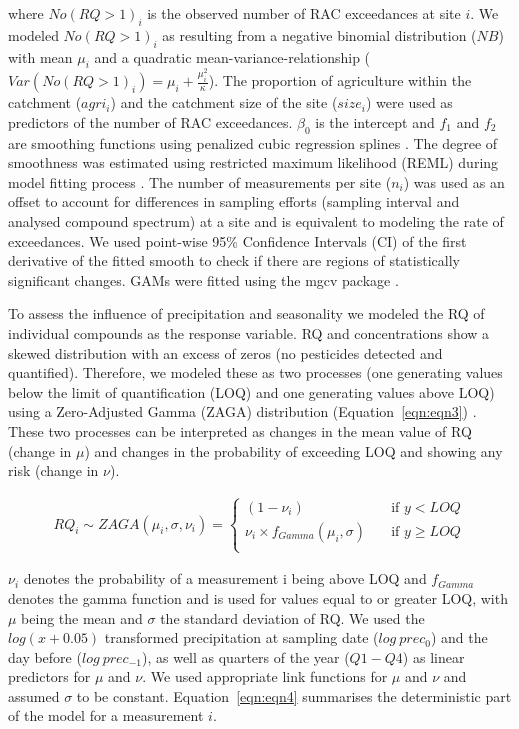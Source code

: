 \documentclass[journal=esthag,manuscript=article]{achemso}
\begin{document}
where $No(RQ > 1)_i$ is the observed number of RAC exceedances at site $i$. 
We modeled $No(RQ > 1)_i$ as resulting from a negative binomial distribution ($NB$) with mean $\mu_i$ and a quadratic mean-variance-relationship ($Var(No(RQ > 1)_i) = \mu_i + \frac{\mu_i^2}{\kappa}$).
The proportion of agriculture within the catchment ($agri_i$) and the catchment size of the site ($size_i$) were used as predictors of the number of RAC exceedances. 
$\beta_0$ is the intercept and $f_1$ and $f_2$ are smoothing functions using penalized cubic regression splines \citep{wood_generalized_2006}. 
The degree of smoothness was estimated using restricted maximum likelihood (REML) during model fitting process \citep{wood_fast_2011}.
The number of measurements per site ($n_i$) was used as an offset to account for differences in sampling efforts (sampling interval and analysed compound spectrum) at a site and is equivalent to modeling the rate of exceedances. 
We used point-wise 95\% Confidence Intervals (CI) of the first derivative of the fitted smooth to check if there are regions of statistically significant changes.
GAMs were fitted using the mgcv package \citep{wood_fast_2011}.

To assess the influence of precipitation and seasonality we modeled the RQ of individual compounds as the response variable.
RQ and concentrations show a skewed distribution with an excess of zeros (no pesticides detected and quantified). 
Therefore, we modeled these as two processes (one generating values below the limit of quantification (LOQ) and one generating values above LOQ) using a Zero-Adjusted Gamma (ZAGA) distribution (Equation~\ref{eqn:eqn3}) \cite{rigby_generalized_2005,stasinopoulos_gamlss.dist:_2016}.
These two processes can be interpreted as changes in the mean value of RQ (change in $\mu$) and changes in the probability of exceeding LOQ and showing any risk (change in $\nu$).

\begin{align}
RQ_i \sim ZAGA(\mu_i, \sigma, \nu_i) = 
  \begin{cases}
    (1 - \nu_i)   & \quad  \text{if } y < LOQ \\
    \nu_i \times f_{Gamma} (\mu_i, \sigma) & \quad \text{if } y \ge LOQ \\
  \end{cases}
  \label{eqn:eqn3}
\end{align}

$\nu_i$ denotes the probability of a measurement i being above LOQ and $f_{Gamma}$ denotes the gamma function and is used for values equal to or greater LOQ, with $\mu$ being the mean and $\sigma$ the standard deviation of RQ.
We used the $log(x+0.05)$ transformed precipitation at sampling date ($log~prec_0$) and the day before ($log~prec_{-1}$), as well as quarters of the year ($Q1-Q4$) as linear predictors for $\mu$ and $\nu$. 
We used appropriate link functions for $\mu$ and $\nu$ and assumed $\sigma$ to be constant. 
Equation~\ref{eqn:eqn4} summarises the deterministic part of the model for a measurement $i$.
\end{document}
